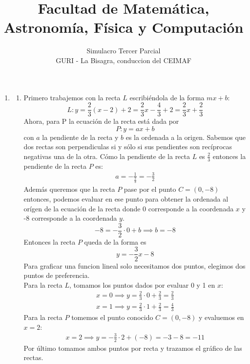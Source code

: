 \documentclass[12pt]{article}
\title{\small Facultad de Matemática, Astronomía, Física y Computación}
\author{Simulacro Tercer Parcial\\ GURI - La Bisagra, conduccion del CEIMAF}
\date{}
\begin{document}
\maketitle
\begin{enumerate}
    \item 
    \begin{enumerate}
        \item Primero trabajemos con la recta $L$ escribiéndola de la forma $mx+b$:
        \begin{equation*}
            L:y=\frac{2}{3}(x-2)+2=\frac{2}{3}x-\frac{4}{3}+2=\frac{2}{3}x+\frac{2}{3}
        \end{equation*}
        Ahora, para P la ecuación de la recta está dada por
        \begin{equation*}
            P: y = ax+b
        \end{equation*}
        con $a$ la pendiente de la recta y $b$ es la ordenada a la origen.
        Sabemos que dos rectas son perpendiculas si y sólo si sus pendientes son recíprocas negativas una de la otra.
        Cómo la pendiente de la recta $L$ es $\frac{2}{3}$ entonces la pendiente de la recta $P$ es:
        \begin{align*}
            a = -\frac{1}{\frac{2}{3}} = -\frac{3}{2}
        \end{align*}
        Además queremos que la recta $P$ pase por el punto $C=(0,-8)$ entonces, podemos evaluar en ese punto para obtener la ordenada al orígen de la ecuación de la recta donde 0 corresponde a la coordenada $x$ y -8 corresponde a la coordenada $y$.
        \begin{equation*}
            -8 = -\frac{3}{2} \cdot 0 +b \implies b = -8
        \end{equation*}
        Entonces la recta $P$ queda de la forma es
        \begin{equation*}
            y = -\frac{3}{2}x-8
        \end{equation*}
        Para graficar una funcion lineal solo necesitamos dos puntos, elegimos dos puntos de preferencia.\\
        Para la recta $L$, tomamos los puntos dados por evaluar 0 y 1 en $x$:
        \begin{gather*}
            x = 0 \implies y = \frac{2}{3}\cdot 0 + \frac{2}{3} = \frac{2}{3} \\
            x = 1 \implies y = \frac{2}{3}\cdot 1 + \frac{2}{3} = \frac{4}{3}
        \end{gather*} 
        Para la recta $P$ tomemos el punto conocido $C=(0,-8)$ y evaluemos en $x=2$:
        \begin{gather*}
            x = 2 \implies y = -\frac{3}{2}\cdot 2 + (-8) = -3 - 8 = -11
        \end{gather*}
        Por último tomamos ambos puntos por recta y trazamos el gráfico de las rectas.


\end{enumerate}
\end{enumerate}
\end{document}
